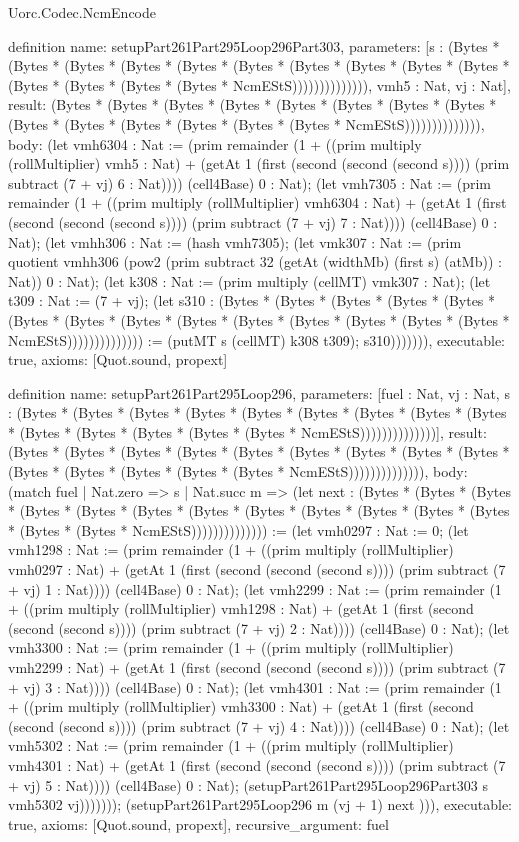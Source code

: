 \begin{lexlean}{Uorc.Codec.NcmEncode}
\begin{semanticmodule}
definition{
  name: setupPart261Part295Loop296Part303,
  parameters: [s : (Bytes * (Bytes * (Bytes * (Bytes * (Bytes * (Bytes * (Bytes * (Bytes * (Bytes * (Bytes * (Bytes * (Bytes * (Bytes * (Bytes * NcmEStS)))))))))))))), vmh5 : Nat, vj : Nat],
  result: (Bytes * (Bytes * (Bytes * (Bytes * (Bytes * (Bytes * (Bytes * (Bytes * (Bytes * (Bytes * (Bytes * (Bytes * (Bytes * (Bytes * NcmEStS)))))))))))))),
  body: (let vmh6304 : Nat := (prim remainder (1 + ((prim multiply (rollMultiplier) vmh5 : Nat) + (getAt 1 (first (second (second (second s)))) (prim subtract (7 + vj) 6 : Nat)))) (cell4Base) 0 : Nat); (let vmh7305 : Nat := (prim remainder (1 + ((prim multiply (rollMultiplier) vmh6304 : Nat) + (getAt 1 (first (second (second (second s)))) (prim subtract (7 + vj) 7 : Nat)))) (cell4Base) 0 : Nat); (let vmhh306 : Nat := (hash vmh7305); (let vmk307 : Nat := (prim quotient vmhh306 (pow2 (prim subtract 32 (getAt (widthMb) (first s) (atMb)) : Nat)) 0 : Nat); (let k308 : Nat := (prim multiply (cellMT) vmk307 : Nat); (let t309 : Nat := (7 + vj); (let s310 : (Bytes * (Bytes * (Bytes * (Bytes * (Bytes * (Bytes * (Bytes * (Bytes * (Bytes * (Bytes * (Bytes * (Bytes * (Bytes * (Bytes * NcmEStS)))))))))))))) := (putMT s (cellMT) k308 t309); s310))))))),
  executable: true,
  axioms: [Quot.sound, propext]
}

definition{
  name: setupPart261Part295Loop296,
  parameters: [fuel : Nat, vj : Nat, s : (Bytes * (Bytes * (Bytes * (Bytes * (Bytes * (Bytes * (Bytes * (Bytes * (Bytes * (Bytes * (Bytes * (Bytes * (Bytes * (Bytes * NcmEStS))))))))))))))],
  result: (Bytes * (Bytes * (Bytes * (Bytes * (Bytes * (Bytes * (Bytes * (Bytes * (Bytes * (Bytes * (Bytes * (Bytes * (Bytes * (Bytes * NcmEStS)))))))))))))),
  body: (match fuel
    | Nat.zero => s
    | Nat.succ m => (let next : (Bytes * (Bytes * (Bytes * (Bytes * (Bytes * (Bytes * (Bytes * (Bytes * (Bytes * (Bytes * (Bytes * (Bytes * (Bytes * (Bytes * NcmEStS)))))))))))))) := (let vmh0297 : Nat := 0; (let vmh1298 : Nat := (prim remainder (1 + ((prim multiply (rollMultiplier) vmh0297 : Nat) + (getAt 1 (first (second (second (second s)))) (prim subtract (7 + vj) 1 : Nat)))) (cell4Base) 0 : Nat); (let vmh2299 : Nat := (prim remainder (1 + ((prim multiply (rollMultiplier) vmh1298 : Nat) + (getAt 1 (first (second (second (second s)))) (prim subtract (7 + vj) 2 : Nat)))) (cell4Base) 0 : Nat); (let vmh3300 : Nat := (prim remainder (1 + ((prim multiply (rollMultiplier) vmh2299 : Nat) + (getAt 1 (first (second (second (second s)))) (prim subtract (7 + vj) 3 : Nat)))) (cell4Base) 0 : Nat); (let vmh4301 : Nat := (prim remainder (1 + ((prim multiply (rollMultiplier) vmh3300 : Nat) + (getAt 1 (first (second (second (second s)))) (prim subtract (7 + vj) 4 : Nat)))) (cell4Base) 0 : Nat); (let vmh5302 : Nat := (prim remainder (1 + ((prim multiply (rollMultiplier) vmh4301 : Nat) + (getAt 1 (first (second (second (second s)))) (prim subtract (7 + vj) 5 : Nat)))) (cell4Base) 0 : Nat); (setupPart261Part295Loop296Part303 s vmh5302 vj))))))); (setupPart261Part295Loop296 m (vj + 1) next ))),
  executable: true,
  axioms: [Quot.sound, propext],
  recursive_argument: fuel
}


\end{semanticmodule}
\end{lexlean}
